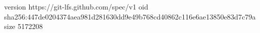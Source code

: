 version https://git-lfs.github.com/spec/v1
oid sha256:447de0204374aea981d281630dd9e49b768cd40862c116e6ae13850e83d7c79a
size 5172208
